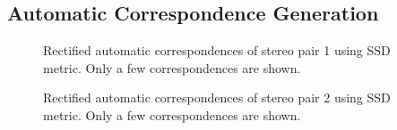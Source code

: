 \documentclass{article}
\begin{document}
\subsection{Automatic Correspondence Generation}
\begin{figure}[!htbp]
     \centering
     \captionsetup[subfigure]{labelformat=empty}
    \caption{Rectified automatic correspondences of stereo pair 1 using SSD metric. Only a few correspondences are shown.}
    \label{fig:auto_rect_corr_1}
\end{figure}
\begin{figure}[!htbp]
     \centering
     \captionsetup[subfigure]{labelformat=empty}
    \caption{Rectified automatic correspondences of stereo pair 2 using SSD metric. Only a few correspondences are shown.}
    \label{fig:auto_rect_corr_2}
\end{figure}


\newpage
\end{document}

